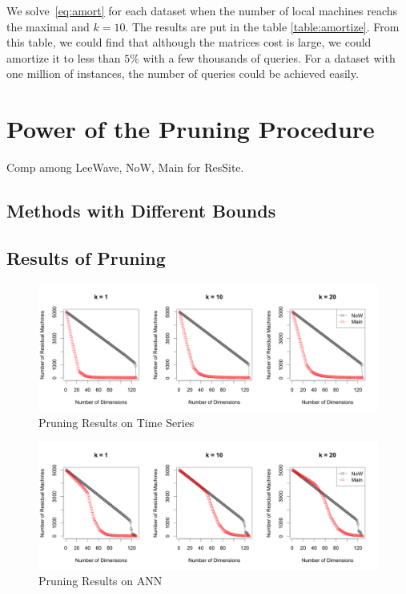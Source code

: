 We solve~\eqref{eq:amort} for each dataset when the number of local machines reachs the maximal and $k=10$.  The results are put in the table \ref{table:amortize}.  From this table, we could find that although the matrices cost is large, we could amortize it to less than $5\%$ with a few thousands of queries.  For a dataset with one million of instances, the number of queries could be achieved easily.  





\section{Power of the Pruning Procedure} %
\label{s:power_of_the_pruning_procedure}

Comp among LeeWave, NoW, Main for ResSite.


\subsection{Methods with Different Bounds} %
\label{sub:methods_with_different_bounds}



\subsection{Results of Pruning} %
\label{sub:results_of_pruning}
	
\begin{figure}[htpb!]
  \centering
  \includegraphics[width=1.0\linewidth]{exp/prune/time.png}
  \caption{Pruning Results on Time Series}
  \label{fig:prune_time}
\end{figure}

\begin{figure}[htpb!]
  \centering
  \includegraphics[width=1.0\linewidth]{exp/prune/ANN.png}
  \caption{Pruning Results on ANN}
  \label{fig:prune_ANN}
\end{figure}

